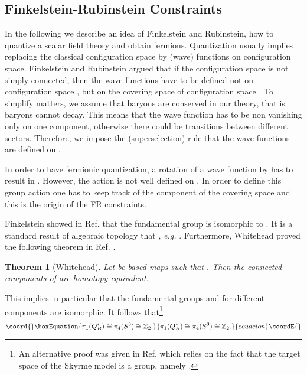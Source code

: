 \documentclass[a4paper,12pt]{article}
\newtheorem {theorem}{Theorem}[section]
\begin{document}
\subsection{Finkelstein-Rubinstein Constraints}
\label{FRconstraints}

In the following we describe an idea of Finkelstein and Rubinstein, how to 
quantize a scalar field theory and obtain fermions. Quantization usually
implies replacing the classical configuration space by (wave) functions on 
configuration space. 
Finkelstein and Rubinstein argued that if the configuration space 
\coordHE{} is not simply connected, then the wave functions have to be defined 
not on configuration space \coordHE{}, but on the covering space of 
configuration space \coordHE{}. To simplify matters, we assume that baryons
are conserved in our theory, that is baryons cannot decay. This means that 
the wave function has to be non vanishing only on one component, otherwise 
there could be transitions between different sectors. Therefore, we impose 
the (superselection) rule that the wave functions are defined on \coordHE{}.

In order to have fermionic quantization, a rotation of a wave function 
\myHighlight{$\psi$}\coordHE{} by \myHighlight{$2 \pi$}\coordHE{} has to result in \myHighlight{$-\psi$}\coordHE{}. However, the \coordHE{} action  
is not well defined on \coordHE{}. In order to define this group action one 
has to keep track of the component of the covering space and this is the 
origin of the FR constraints.

Finkelstein showed in Ref. \cite{Finkelstein:1966ft} that the
fundamental group \coordHE{} is isomorphic to \coordHE{}. 
It is a standard  result of algebraic topology that \coordHE{}, {\it e.g.} \cite{Hatcher:2002}. Furthermore, Whitehead
proved the following theorem in Ref. \cite{Whitehead:1946}.
%
\begin{theorem}[Whitehead]
\label{Whitehead}
Let \coordHE{} be based maps \coordHE{} such that \coordHE{}.
Then the connected components of \coordHE{} are homotopy equivalent. 
\hfill \myHighlight{$\square$}\coordHE{}
\end{theorem}

This implies in particular that the fundamental groups \coordHE{}
and \coordHE{} for different components  are isomorphic.
It follows that\footnote{An alternative proof was given in Ref. 
\cite{Giulini:1993gd} which relies on the fact that the target space of  
the Skyrme model is a group, namely \coordHE{}.}
%
\begin{equation}\coord{}\boxEquation{
\pi_1(Q_B^*) \cong \pi_4(S^3) \cong {\mathbb Z}_2.
}{
\pi_1(Q_B^*) \cong \pi_4(S^3) \cong {\mathbb Z}_2.
}{ecuacion}\coordE{}\end{equation}
%
\end{document}

